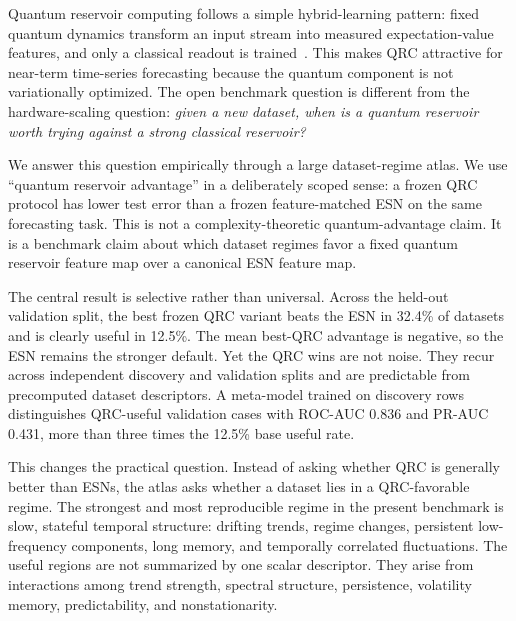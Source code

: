 Quantum reservoir computing follows a simple hybrid-learning pattern: fixed quantum dynamics transform an input stream into measured expectation-value features, and only a classical readout is trained~\cite{fujii2017harnessing,nakajima2019boosting,ghosh2019quantum}. This makes QRC attractive for near-term time-series forecasting because the quantum component is not variationally optimized. The open benchmark question is different from the hardware-scaling question: \emph{given a new dataset, when is a quantum reservoir worth trying against a strong classical reservoir?}

We answer this question empirically through a large dataset-regime atlas. We use ``quantum reservoir advantage'' in a deliberately scoped sense: a frozen QRC protocol has lower test error than a frozen feature-matched ESN on the same forecasting task. This is not a complexity-theoretic quantum-advantage claim. It is a benchmark claim about which dataset regimes favor a fixed quantum reservoir feature map over a canonical ESN feature map.

The central result is selective rather than universal. Across the held-out validation split, the best frozen QRC variant beats the ESN in 32.4\% of datasets and is clearly useful in 12.5\%. The mean best-QRC advantage is negative, so the ESN remains the stronger default. Yet the QRC wins are not noise. They recur across independent discovery and validation splits and are predictable from precomputed dataset descriptors. A meta-model trained on discovery rows distinguishes QRC-useful validation cases with ROC-AUC 0.836 and PR-AUC 0.431, more than three times the 12.5\% base useful rate.

This changes the practical question. Instead of asking whether QRC is generally better than ESNs, the atlas asks whether a dataset lies in a QRC-favorable regime. The strongest and most reproducible regime in the present benchmark is slow, stateful temporal structure: drifting trends, regime changes, persistent low-frequency components, long memory, and temporally correlated fluctuations. The useful regions are not summarized by one scalar descriptor. They arise from interactions among trend strength, spectral structure, persistence, volatility memory, predictability, and nonstationarity.

